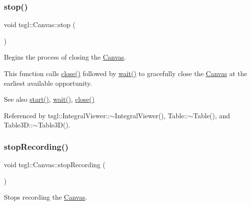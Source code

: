 \mbox{\label{classtsgl_1_1_canvas_a46cd37a9f2a146e57b4e0273faf6485c}} 
\subsubsection{\texorpdfstring{stop()}{stop()}}
{\footnotesize\ttfamily void tsgl\+::\+Canvas\+::stop (\begin{DoxyParamCaption}{ }\end{DoxyParamCaption})}



Begins the process of closing the \hyperlink{classtsgl_1_1_canvas}{Canvas}. 

This function calls \hyperlink{classtsgl_1_1_canvas_afaa1250b1da6b48b9c170a0655191938}{close()} followed by \hyperlink{classtsgl_1_1_canvas_a39e69fd4d1ad8cf0e22ecea12f1ddf08}{wait()} to gracefully close the \hyperlink{classtsgl_1_1_canvas}{Canvas} at the earliest available opportunity. \begin{DoxySeeAlso}{See also}
\hyperlink{classtsgl_1_1_canvas_a654315f9b08a9b3b072eebf4b4d8ae89}{start()}, \hyperlink{classtsgl_1_1_canvas_a39e69fd4d1ad8cf0e22ecea12f1ddf08}{wait()}, \hyperlink{classtsgl_1_1_canvas_afaa1250b1da6b48b9c170a0655191938}{close()} 
\end{DoxySeeAlso}


Referenced by tsgl\+::\+Integral\+Viewer\+::$\sim$\+Integral\+Viewer(), Table\+::$\sim$\+Table(), and Table3\+D\+::$\sim$\+Table3\+D().

\mbox{\label{classtsgl_1_1_canvas_ac6035d87aa3bf077031bc0bb6f419b17}} 
\subsubsection{\texorpdfstring{stop\+Recording()}{stopRecording()}}
{\footnotesize\ttfamily void tsgl\+::\+Canvas\+::stop\+Recording (\begin{DoxyParamCaption}{ }\end{DoxyParamCaption})}



Stops recording the \hyperlink{classtsgl_1_1_canvas}{Canvas}. 

